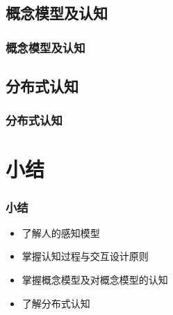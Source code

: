 \documentclass{beamer}
\begin{document}
\subsection{概念模型及认知}
\begin{frame}
	\frametitle{概念模型及认知}

\end{frame}

\subsection{分布式认知}
\begin{frame}
	\frametitle{分布式认知}

\end{frame}

\section{小结}
\begin{frame}
	\frametitle{小结}
	\begin{itemize}
		\item 了解人的感知模型
		\item 掌握认知过程与交互设计原则
		\item 掌握概念模型及对概念模型的认知
		\item 了解分布式认知
	\end{itemize}
\end{frame}
 
\end{document}
